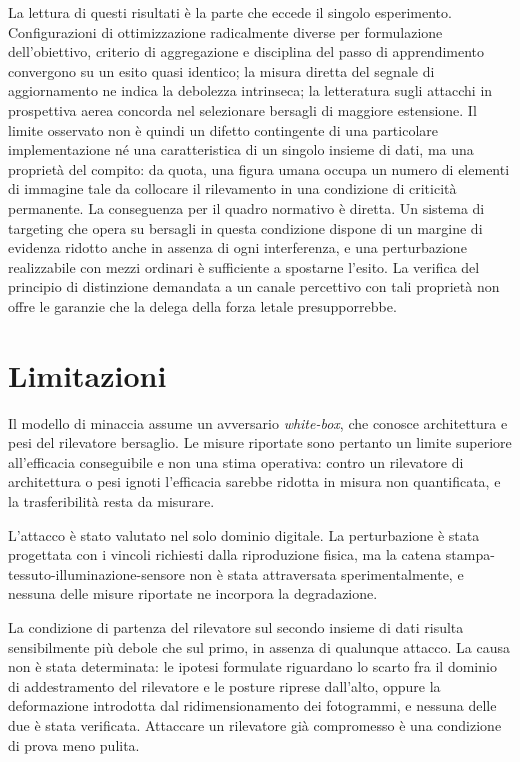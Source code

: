 \documentclass[a4paper,12pt]{report}
\begin{document}
La lettura di questi risultati è la parte che eccede il singolo esperimento. Configurazioni di ottimizzazione radicalmente diverse per formulazione dell'obiettivo, criterio di aggregazione e disciplina del passo di apprendimento convergono su un esito quasi identico; la misura diretta del segnale di aggiornamento ne indica la debolezza intrinseca; la letteratura sugli attacchi in prospettiva aerea concorda nel selezionare bersagli di maggiore estensione. Il limite osservato non è quindi un difetto contingente di una particolare implementazione né una caratteristica di un singolo insieme di dati, ma una proprietà del compito: da quota, una figura umana occupa un numero di elementi di immagine tale da collocare il rilevamento in una condizione di criticità permanente. La conseguenza per il quadro normativo è diretta. Un sistema di targeting che opera su bersagli in questa condizione dispone di un margine di evidenza ridotto anche in assenza di ogni interferenza, e una perturbazione realizzabile con mezzi ordinari è sufficiente a spostarne l'esito. La verifica del principio di distinzione demandata a un canale percettivo con tali proprietà non offre le garanzie che la delega della forza letale presupporrebbe.

\section{Limitazioni}

Il modello di minaccia assume un avversario \textit{white-box}, che conosce
architettura e pesi del rilevatore bersaglio. Le misure riportate sono
pertanto un limite superiore all'efficacia conseguibile e non una stima
operativa: contro un rilevatore di architettura o pesi ignoti l'efficacia
sarebbe ridotta in misura non quantificata, e la trasferibilità resta da
misurare.

L'attacco è stato valutato nel solo dominio digitale. La perturbazione è stata progettata con i vincoli richiesti dalla riproduzione fisica, ma la catena stampa-tessuto-illuminazione-sensore non è stata attraversata sperimentalmente, e nessuna delle misure riportate ne incorpora la degradazione.

La condizione di partenza del rilevatore sul secondo insieme di dati risulta sensibilmente più debole che sul primo, in assenza di qualunque attacco. La causa non è stata determinata: le ipotesi formulate riguardano lo scarto fra il dominio di addestramento del rilevatore e le posture riprese dall'alto, oppure la deformazione introdotta dal ridimensionamento dei fotogrammi, e nessuna delle due è stata verificata. Attaccare un rilevatore già compromesso è una condizione di prova meno pulita.
\end{document}
